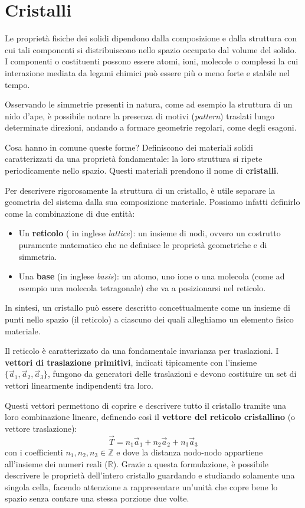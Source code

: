 \chapter{Cristalli}


Le proprietà fisiche dei solidi dipendono dalla composizione e dalla struttura con cui tali componenti si distribuiscono nello spazio occupato dal volume del solido. I componenti o costituenti possono essere atomi, ioni, molecole o complessi la cui interazione mediata da legami chimici può essere più o meno forte e stabile nel tempo.

Osservando le simmetrie presenti in natura, come ad esempio la struttura di un nido d'ape, è possibile notare la presenza di motivi (\textit{pattern}) traslati lungo determinate direzioni, andando a formare geometrie regolari, come degli esagoni.

Cosa hanno in comune queste forme? Definiscono dei materiali solidi caratterizzati da una proprietà fondamentale: la loro struttura si ripete periodicamente nello spazio. Questi materiali prendono il nome di \textbf{cristalli}.

Per descrivere rigorosamente la struttura di un cristallo, è utile separare la geometria del sistema dalla sua composizione materiale. Possiamo infatti definirlo come la combinazione di due entità:
\begin{itemize}
    \item Un \textbf{reticolo} ( in inglese \textit{lattice}): un insieme di nodi, ovvero un costrutto puramente matematico che ne definisce le proprietà geometriche e di simmetria.
    \item Una \textbf{base} (in inglese \textit{basis}): un atomo, uno ione o una molecola (come ad esempio una molecola tetragonale) che va a posizionarsi nel reticolo.
\end{itemize}

In sintesi, un cristallo può essere descritto concettualmente come un insieme di punti nello spazio (il reticolo) a ciascuno dei quali alleghiamo un elemento fisico materiale.

Il reticolo è caratterizzato da una fondamentale invarianza per traslazioni. I \textbf{vettori di traslazione primitivi}, indicati tipicamente con l'insieme \( \{ \vec{a}_1, \vec{a}_2, \vec{a}_3 \} \), fungono da generatori delle traslazioni e devono costituire un set di vettori linearmente indipendenti tra loro.

Questi vettori permettono di coprire e descrivere tutto il cristallo tramite una loro combinazione lineare, definendo così il \textbf{vettore del reticolo cristallino} (o vettore traslazione):
\begin{equation}
    \vec{T} = n_1 \vec{a}_1 + n_2 \vec{a}_2 + n_3 \vec{a}_3
\end{equation}
con i coefficienti \( n_1, n_2, n_3 \in \mathbb{Z} \) e dove la distanza nodo-nodo appartiene all'insieme dei numeri reali (\( \mathbb{R} \)). Grazie a questa formulazione, è possibile descrivere le proprietà dell'intero cristallo guardando e studiando solamente una singola cella, facendo attenzione a rappresentare un'unità che copre bene lo spazio senza contare una stessa porzione due volte.

